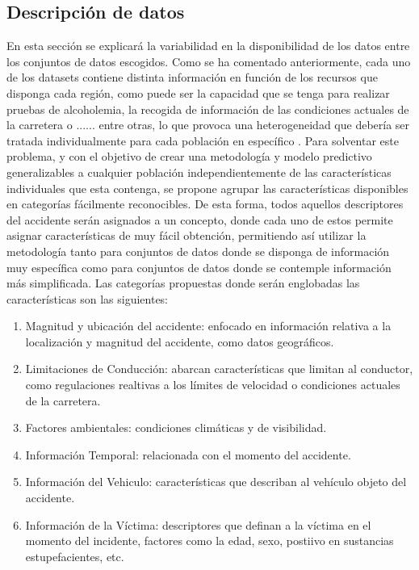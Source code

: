 \documentclass{uathesis-es}
\begin{document}
\subsection{Descripción de datos}

En esta sección se explicará la variabilidad en la disponibilidad de los datos entre los conjuntos de datos escogidos. Como se ha comentado anteriormente, cada uno de los datasets contiene distinta información en función de los recursos que disponga cada región, como puede ser la capacidad que se tenga para realizar pruebas de alcoholemia, la recogida de información de las condiciones actuales de la carretera o ...... entre otras, lo que provoca una heterogeneidad que debería ser tratada individualmente para cada población en específico . Para solventar este problema, y con el objetivo de crear una metodología y modelo predictivo generalizables a cualquier población independientemente de las características individuales que esta contenga, se propone agrupar las características disponibles en categorías fácilmente reconocibles. De esta forma, todos aquellos descriptores del accidente serán asignados a un concepto, donde cada uno de estos permite asignar características de muy fácil obtención, permitiendo así utilizar la metodología tanto para conjuntos de datos donde se disponga de información muy específica como para conjuntos de datos donde se contemple información más simplificada. Las categorías propuestas donde serán englobadas las características son las siguientes:

\begin{enumerate}
    \item Magnitud y ubicación del accidente: enfocado en información relativa a la localización y magnitud del accidente, como datos geográficos.
    \item Limitaciones de Conducción: abarcan características que limitan al conductor, como regulaciones realtivas a los límites de velocidad o condiciones actuales de la carretera.
    \item Factores ambientales: condiciones climáticas y de visibilidad.
    \item Información Temporal: relacionada con el momento del accidente.
    \item Información del Vehiculo: características que describan al vehículo objeto del accidente.
    \item Información de la Víctima: descriptores que definan a la víctima en el momento del incidente, factores como la edad, sexo, postiivo en sustancias estupefacientes, etc.
\end{enumerate}
\end{document}
